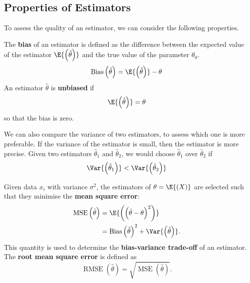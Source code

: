 \documentclass{article}
\begin{document}
\subsection{Properties of Estimators}
To assess the quality of an estimator, we can consider the following properties.
\begin{definition}[Bias]
    The \textbf{bias} of an estimator is defined as
    the difference between the expected value of the estimator \(\E{\left( \hat{\theta} \right)}\) and the true value of the parameter \(\theta_0\).
    \begin{equation*}
        \operatorname{Bias}\left( \hat{\theta} \right) = \E{\left( \hat{\theta} \right)} - \theta
    \end{equation*}
    An estimator \(\hat{\theta}\) is \textbf{unbiased} if
    \begin{equation*}
        \E{\left( \hat{\theta} \right)} = \theta
    \end{equation*}
    so that the bias is zero.
\end{definition}
We can also compare the variance of two estimators, to assess which one is more preferable.
If the variance of the estimator is small, then the estimator is more precise.
Given two estimators \(\hat{\theta}_1\) and \(\hat{\theta}_2\), we would choose \(\hat{\theta}_1\) over \(\hat{\theta}_2\) if
\begin{equation*}
    \Var{\left( \hat{\theta}_1 \right)} < \Var{\left( \hat{\theta}_2 \right)}
\end{equation*}
\begin{definition}
    Given data \(x_i\) with variance \(\sigma^2\), the estimators of \(\theta = \E{\left( X \right)}\)
    are selected such that they minimise the \textbf{mean square error}:
    \begin{align*}
        \operatorname{MSE}\left( \hat{\theta} \right) & = \E{\left( \left( \hat{\theta} - \theta \right)^2 \right)}                             \\
                                                      & = \operatorname{Bias}\left( \hat{\theta} \right)^2 + \Var{\left( \hat{\theta} \right)}.
    \end{align*}
    This quantity is used to determine the \textbf{bias-variance trade-off} of an estimator.
    The \textbf{root mean square error} is defined as
    \begin{equation*}
        \operatorname{RMSE}\left( \hat{\theta} \right) = \sqrt{\operatorname{MSE}\left( \hat{\theta} \right)}.
    \end{equation*}
\end{definition}
\end{document}
